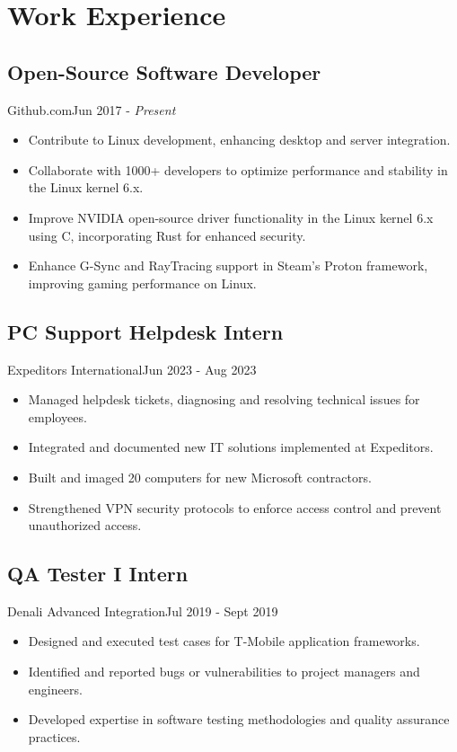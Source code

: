 \section{Work Experience}
\subsection{Open-Source Software Developer}{Github.com}{Jun 2017 - \textit{Present}}
\begin{itemize}
  \item Contribute to Linux development, enhancing desktop and server integration.
  \item Collaborate with 1000+ developers to optimize performance and stability in the Linux kernel 6.x.
  \item Improve NVIDIA open-source driver functionality in the Linux kernel 6.x using C, incorporating Rust for enhanced security.
  \item Enhance G-Sync and RayTracing support in Steam’s Proton framework, improving gaming performance on Linux.
\end{itemize}

\subsection{PC Support Helpdesk Intern}{Expeditors International}{Jun 2023 - Aug 2023}
\begin{itemize}
    \item Managed helpdesk tickets, diagnosing and resolving technical issues for employees.
    \item Integrated and documented new IT solutions implemented at Expeditors.
    \item Built and imaged 20 computers for new Microsoft contractors.
    \item Strengthened VPN security protocols to enforce access control and prevent unauthorized access.
\end{itemize}

\subsection{QA Tester I Intern}{Denali Advanced Integration}{Jul 2019 - Sept 2019}
\begin{itemize}
   \item Designed and executed test cases for T-Mobile application frameworks.
   \item Identified and reported bugs or vulnerabilities to project managers and engineers.
   \item Developed expertise in software testing methodologies and quality assurance practices.
\end{itemize}
